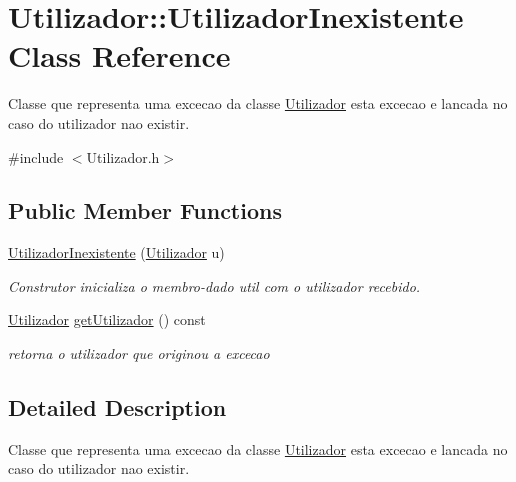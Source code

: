 \hypertarget{class_utilizador_1_1_utilizador_inexistente}{}\section{Utilizador\+:\+:Utilizador\+Inexistente Class Reference}
\label{class_utilizador_1_1_utilizador_inexistente}


Classe que representa uma excecao da classe \hyperlink{class_utilizador}{Utilizador} esta excecao e lancada no caso do utilizador nao existir.  




{\ttfamily \#include $<$Utilizador.\+h$>$}

\subsection*{Public Member Functions}
\begin{DoxyCompactItemize}
\item 
\hypertarget{class_utilizador_1_1_utilizador_inexistente_ab909f5f17ec8758526bc28a3fbc4fdc1}{}\hyperlink{class_utilizador_1_1_utilizador_inexistente_ab909f5f17ec8758526bc28a3fbc4fdc1}{Utilizador\+Inexistente} (\hyperlink{class_utilizador}{Utilizador} u)\label{class_utilizador_1_1_utilizador_inexistente_ab909f5f17ec8758526bc28a3fbc4fdc1}

\begin{DoxyCompactList}\small\item\em Construtor inicializa o membro-\/dado util com o utilizador recebido. \end{DoxyCompactList}\item 
\hyperlink{class_utilizador}{Utilizador} \hyperlink{class_utilizador_1_1_utilizador_inexistente_a3764a58cb62c6aa40f6d59a5762b52a5}{get\+Utilizador} () const 
\begin{DoxyCompactList}\small\item\em retorna o utilizador que originou a excecao \end{DoxyCompactList}\end{DoxyCompactItemize}


\subsection{Detailed Description}
Classe que representa uma excecao da classe \hyperlink{class_utilizador}{Utilizador} esta excecao e lancada no caso do utilizador nao existir. 

